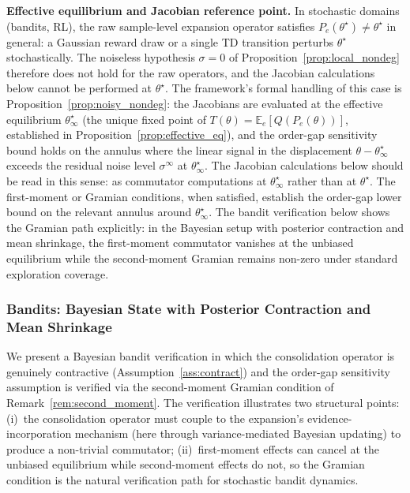 \documentclass[12pt,a4paper]{article}
\begin{document}
\textbf{Effective equilibrium and Jacobian reference point.} In stochastic
domains (bandits, RL), the raw sample-level expansion operator satisfies
$P_e(\theta^\star) \neq \theta^\star$ in general: a Gaussian reward draw or
a single TD transition perturbs $\theta^\star$ stochastically. The noiseless
hypothesis $\sigma = 0$ of Proposition~\ref{prop:local_nondeg} therefore does
not hold for the raw operators, and the Jacobian calculations below cannot be
performed at $\theta^\star$. The framework's formal handling of this case is
Proposition~\ref{prop:noisy_nondeg}: the Jacobians are evaluated at the
effective equilibrium $\theta^\star_\infty$ (the unique fixed point of
$T(\theta) = \mathbb{E}_e[Q(P_e(\theta))]$, established in
Proposition~\ref{prop:effective_eq}), and the order-gap sensitivity bound
holds on the annulus where the linear signal in the displacement
$\theta - \theta^\star_\infty$ exceeds the residual noise level
$\sigma^\infty$ at $\theta^\star_\infty$. The Jacobian calculations below
should be read in this sense: as commutator computations at
$\theta^\star_\infty$ rather than at $\theta^\star$. The first-moment or
Gramian conditions, when satisfied, establish the order-gap lower bound on
the relevant annulus around $\theta^\star_\infty$. The bandit verification
below shows the Gramian path explicitly: in the Bayesian setup with
posterior contraction and mean shrinkage, the first-moment commutator
vanishes at the unbiased equilibrium while the second-moment Gramian remains
non-zero under standard exploration coverage.

\subsubsection*{Bandits: Bayesian State with Posterior Contraction and Mean Shrinkage}

We present a Bayesian bandit verification in which the consolidation
operator is genuinely contractive (Assumption~\ref{ass:contract}) and the
order-gap sensitivity assumption is verified via the second-moment Gramian
condition of Remark~\ref{rem:second_moment}. The verification illustrates
two structural points: (i)~the consolidation operator must couple to the
expansion's evidence-incorporation mechanism (here through variance-mediated
Bayesian updating) to produce a non-trivial commutator; (ii)~first-moment
effects can cancel at the unbiased equilibrium while second-moment effects
do not, so the Gramian condition is the natural verification path for
stochastic bandit dynamics.
\end{document}
